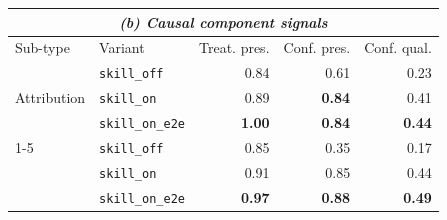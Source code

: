 \begin{table}[t]
\setlength{\tabcolsep}{3pt}
\begin{tabular}{llrrr}
\multicolumn{5}{c}{\textit{(b) Causal component signals}} \\
\toprule
Sub-type & Variant & Treat. pres. & Conf. pres. & Conf. qual. \\
\midrule
\multirow{3}{*}{\textsf{Attribution}}
 & \texttt{skill\_off}     & 0.84 & 0.61 & 0.23 \\
 & \texttt{skill\_on}      & 0.89 & \textbf{0.84} & 0.41 \\
 & \texttt{skill\_on\_e2e} & \textbf{1.00} & \textbf{0.84} & \textbf{0.44} \\
\cmidrule(lr){1-5}
\multirow{3}{*}{\textsf{What-If}}
 & \texttt{skill\_off}     & 0.85 & 0.35 & 0.17 \\
 & \texttt{skill\_on}      & 0.91 & 0.85 & 0.44 \\
 & \texttt{skill\_on\_e2e} & \textbf{0.97} & \textbf{0.88} & \textbf{0.49} \\
\bottomrule
\end{tabular}
\end{table}

